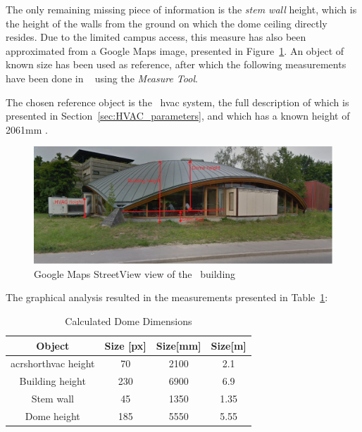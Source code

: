 The only remaining missing piece of information is the \textit{stem wall}
height, which is the height of the walls from the ground on which the dome
ceiling directly resides. Due to the limited campus access, this measure has
also been approximated from a Google Maps image, presented in
Figure~\ref{fig:Google_Maps_Streetview}. An object of known size has been used
as reference, after which the following measurements have been done in
~\cite{kimballGIMPGNUImage} using the
\textit{Measure Tool}.

The chosen reference object is the \pdome\ \acrshort{hvac} system, the full
description of which is presented in Section~\ref{sec:HVAC_parameters}, and
which has a known height of 2061mm \cite{aermecRoofTopManuelSelection}.

\clearpage

\begin{figure}[ht]
    \centering
    \includegraphics[width = \textwidth]{Images/polydome_streetview_annotated}
    \caption{Google Maps StreetView view of the \pdome\ building}
    \label{fig:Google_Maps_Streetview}
\end{figure}

The graphical analysis resulted in the measurements presented in
Table~\ref{tab:GIMP_measurements}:

\begin{table}[ht]
\centering
    \begin{tabular}{||c c c c||}
        \hline
        Object & Size [px] & Size[mm] & Size[m]\\
        \hline \hline
        acrshort{hvac} height & 70 & 2100 & 2.1 \\
        Building height & 230 & 6900 & 6.9 \\
        Stem wall & 45 & 1350 & 1.35 \\
        Dome height & 185 & 5550 & 5.55 \\
        \hline
    \end{tabular}
\caption{Calculated Dome Dimensions}
\label{tab:GIMP_measurements}
\end{table}

